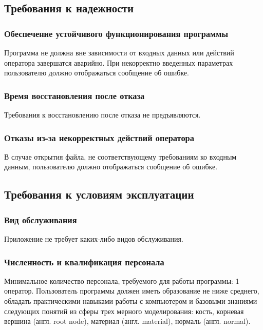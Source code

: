 \subsection{Требования к надежности}
\subsubsection{Обеспечение устойчивого функционирования программы}
Программа не должна вне зависимости от входных данных или действий оператора завершатся аварийно. При некорректно введенных параметрах пользователю должно отображаться сообщение об ошибке.
\subsubsection{Время восстановления после отказа}
Требования к восстановлению после отказа не предъявляются.
\subsubsection{Отказы из-за некорректных действий оператора}
В случае открытия файла, не соответствующему требованиям ко входным данным, пользователю должно отображаться сообщение об ошибке.

\subsection{Требования к условиям эксплуатации}
\subsubsection{Вид обслуживания}
Приложение не требует каких-либо видов обслуживания.
\subsubsection{Численность и квалификация персонала}
Минимальное количество персонала, требуемого для работы программы: 1 оператор. Пользователь программы должен иметь образование не ниже среднего, обладать практическими навыками работы с компьютером и базовыми знаниями следующих понятий из сферы трех мерного моделирования: кость, корневая вершина (англ. root node), материал (англ. material), нормаль (англ. normal).


